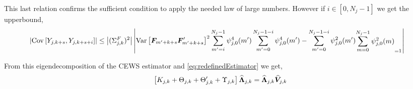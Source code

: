 \documentclass[main_document.tex]{subfiles}
\begin{document}
This last relation confirms the sufficient condition to apply the needed law of large numbers. 
However if $i \in [0,N_j-1]$ we get the upperbound, 
\begin{align*}
	\abs{\Cov{Y_{j,k+s}}{Y_{j,k+s+i}}} & \leq \abs{ (\Sigma_{j,k}^{F})^{2}} \abs{\Var{\factors{m'+k+s}\factors{m'+k+s}'}^{2} \sum_{m'=i}^{N_j-1}\waveletExp{j}{0}{m'}{4}\sum_{m'=0}^{N_j-1-i}\waveletExp{j}{0}{m'}{4} - \sum_{m'=0}^{N_j-1-i} \squaredWavelet{j}{0}{m'} \substack{\sum_{m=0}^{N_j-1} \squaredWavelet{j}{0}{m}}_{=1}}
\end{align*}





From this eigendecomposition of the CEWS estimator and \eqref{eq:redefinedEstimator} we get, 
\begin{align*}
	\left [ K_{j,k} + \Theta_{j,k} + \Theta_{j,k}' + \Upsilon_{j,k} \right] \widehat{\bm{\Lambda}}_{j,k} = \widehat{\bm{\Lambda}}_{j,k} \widehat{\bm{V}}_{j,k}
\end{align*}
\end{document}
